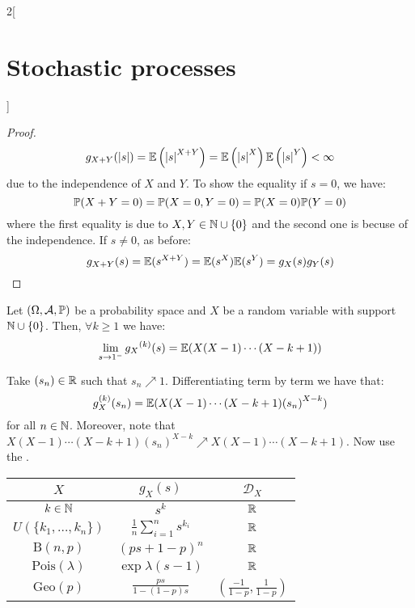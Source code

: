 \documentclass[../../../main_math.tex]{subfiles}
\begin{document}
\begin{multicols}{2}[\section{Stochastic processes}]
\begin{proof}
    $$g_{X+Y}(\abs{s})=\mathbb{E}\left(\abs{s}^{X+Y}\right)=\mathbb{E}\left(\abs{s}^X\right)\mathbb{E}\left(\abs{s}^Y\right)<\infty$$
    due to the independence of $X$ and $Y$.
    To show the equality if $s=0$, we have:
    $$\mathbb{P}(X+Y=0)=\mathbb{P}(X=0,Y=0)=\mathbb{P}(X=0)\mathbb{P}(Y=0)$$
    where the first equality is due to $X,Y\in\mathbb{N}\cup\{0\}$ and the second one is becuse of the independence.
    If $s\ne 0$, as before: $$g_{X+Y}({s})=\mathbb{E}({s}^{X+Y})=\mathbb{E}({s}^X)\mathbb{E}({s}^Y)=g_{X}({s})g_{Y}({s})$$
  \end{proof}
  \begin{theorem}
    Let $(\Omega,\mathcal{A},\mathbb{P})$ be a probability space and $X$ be a random variable with support $\mathbb{N}\cup\{0\}$. Then, $\forall k\geq 1$ we have:
    $$\lim_{s\to 1^-}{g_X}^{(k)}(s)=\mathbb{E}(X(X-1)\cdots(X-k+1))$$
  \end{theorem}
  \begin{sproof}
    Take $(s_n)\in\mathbb{R}$ such that $s_n\nearrow 1$. Differentiating term by term we have that:
    $$
      g_{X}^{(k)}(s_n)=\mathbb{E}(X(X-1)\cdots (X-k+1){(s_n)}^{X-k})
    $$
    for all $n\in\mathbb{N}$. Moreover, note that $X(X-1)\cdots (X-k+1){(s_n)}^{X-k}\nearrow X(X-1)\cdots (X-k+1)$. Now use the .
  \end{sproof}
  \begin{center}
    \def\arraystretch{1.3}
    \begin{tabular}{|c|c|c|}
      \hline
      $X$                     & $g_X(s)$                            & $\mathcal{D}_X$                                          \\
      \hline
      $k\in\mathbb{N}$               & $\displaystyle s^{k}$               & $\mathbb{R}$                                                    \\
      $U(\{k_1,\ldots,k_n\})$ & $\frac{1}{n}\sum_{i=1}^n s^{k_i}$   & $\mathbb{R}$                                                    \\
      $\text{B}(n,p)$         & $\displaystyle {(ps+1-p)}^n$        & $\mathbb{R}$                                                    \\
      $\text{Pois}(\lambda)$  & $\displaystyle \exp{\lambda(s-1)}$  & $\mathbb{R}$                                                    \\
      $\text{Geo}(p)$         & $\displaystyle \frac{ps}{1-(1-p)s}$ & $\displaystyle\left(\frac{-1}{1-p},\frac{1}{1-p}\right)$ \\
      \hline
    \end{tabular}
  \end{center}

\end{multicols}
\end{document}
